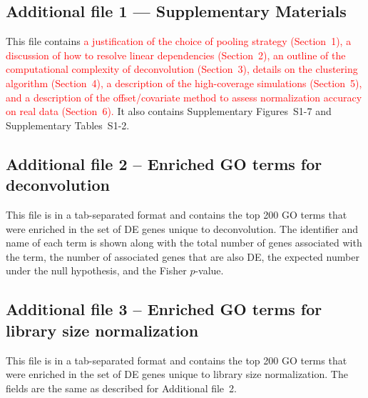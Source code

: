\documentclass{bmcart}
\newcommand{\supppoolsim}{1}
\newcommand{\supplineardep}{2}
\newcommand{\supptimecomp}{3}
\newcommand{\suppclustering}{4}
\newcommand{\supphighcov}{5}
\newcommand{\supprealassess}{6}
\newcommand{\revised}[1]{\textcolor{red}{#1}}
\begin{document}
\begin{backmatter}
\subsection*{Additional file 1 --- Supplementary Materials}
This file contains \revised{a justification of the choice of pooling strategy (Section~\supppoolsim{}),
    a discussion of how to resolve linear dependencies (Section~\supplineardep{}),
    an outline of the computational complexity of deconvolution (Section~\supptimecomp{}),
    details on the clustering algorithm (Section~\suppclustering{}),
    a description of the high-coverage simulations (Section~\supphighcov{}),
    and a description of the offset/covariate method to assess normalization accuracy on real data (Section~\supprealassess{}).}
It also contains Supplementary Figures~S1-7 and Supplementary Tables~S1-2.

\subsection*{Additional file 2 -- Enriched GO terms for deconvolution}
This file is in a tab-separated format and contains the top 200 GO terms that were enriched in the set of DE genes unique to deconvolution.
The identifier and name of each term is shown along with the total number of genes associated with the term, the number of associated genes that are also DE, the expected number under the null hypothesis, and the Fisher $p$-value.

\subsection*{Additional file 3 -- Enriched GO terms for library size normalization}
This file is in a tab-separated format and contains the top 200 GO terms that were enriched in the set of DE genes unique to library size normalization.
The fields are the same as described for Additional file~2.

\end{backmatter}
\end{document}
